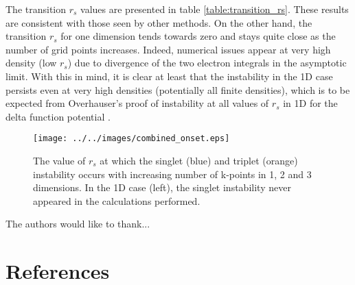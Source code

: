 \documentclass[preprint, journal=prl]{revtex4-1}
\begin{document}
  The transition $r_s$ values are presented in table \ref{table:transition_rs}. These results are consistent with those seen by other methods\cite{Baguet2014, Bernu2011}. On the other hand, the transition $r_s$ for one dimension tends towards zero and stays quite close as the number of grid points increases. Indeed, numerical issues appear at very high density (low $r_s$) due to divergence of the two electron integrals in the asymptotic limit. With this in mind, it is clear at least that the instability in the 1D case persists even at very high densities (potentially all finite densities), which is to be expected from Overhauser's proof of instability at all values of $r_s$ in 1D for the delta function potential \cite{Overhauser1962}.
  \begin{figure}
    \centering
    \texttt{[image: ../../images/combined\_onset.eps]}
    \caption{The value of $r_s$ at which the singlet (blue) and triplet (orange) instability    occurs with increasing number of k-points in 1, 2 and 3 dimensions. In the 1D case (left), the singlet instability never appeared in the calculations performed. }
    \label{fig:onset}
  \end{figure}
  
\begin{acknowledgements}
The authors would like to thank...
\end{acknowledgements}

\section{References}

\end{document}
